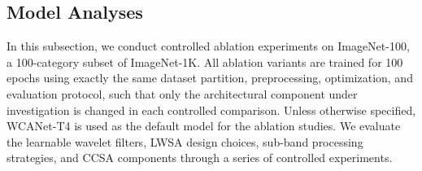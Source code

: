 \documentclass[a4paper,fleqn]{cas-dc}
\begin{document}





\subsection{Model Analyses}



{\color{blue}
In this subsection, we conduct controlled ablation experiments on
ImageNet-100, a 100-category subset of ImageNet-1K. All ablation variants
are trained for 100 epochs using exactly the same dataset partition,
preprocessing, optimization, and evaluation protocol, such that only the
architectural component under investigation is changed in each controlled
comparison. Unless otherwise specified, WCANet-T4 is used as the default
model for the ablation studies.
}
{\color{blue}
We evaluate the learnable wavelet filters, LWSA design choices, sub-band processing strategies, and CCSA components through a series of controlled experiments.
}
\end{document}
